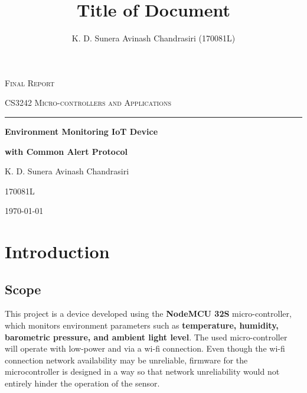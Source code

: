 \documentclass[12pt,a4paper]{article}
\title{Title of Document}
\author{K. D. Sunera Avinash Chandrasiri (170081L)}
\begin{document}

\begin{titlepage}

    {\hfill\scshape\Large Final Report \par}
    {\hfill\scshape CS3242 Micro-controllers and Applications\par}
    {\vspace{.5cm}}
    {\hrule}
    \vspace{2.5cm}
    {\hfill\huge\bfseries Environment Monitoring IoT Device\par}
    {\hfill\huge\bfseries with Common Alert Protocol\par}
    \vspace{1cm}
    {\hfill\large K. D. Sunera Avinash Chandrasiri\par}
    {\hfill\large 170081L\par}
    \vfill
    \hfill \today \par
\end{titlepage}

\newpage



\tableofcontents
\newpage


\section{Introduction}

\subsection{Scope}

This project is a device developed using the
\textbf{NodeMCU 32S} micro-controller, which monitors
environment parameters such as \textbf{temperature,
    humidity, barometric pressure, and ambient
    light level}. The used micro-controller will
operate with low-power and via a wi-fi connection.
Even though the wi-fi connection network
availability may be unreliable, firmware
for the microcontroller is designed in a way
so that network unreliability would not
entirely hinder the operation of the sensor. \par
\end{document}
